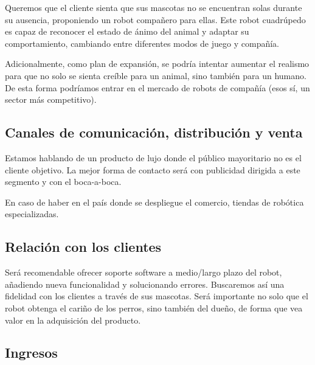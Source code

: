 Queremos que el cliente sienta que sus mascotas no se encuentran solas durante su ausencia, proponiendo un robot compañero para ellas. Este robot cuadrúpedo es capaz de reconocer el estado de ánimo del animal y adaptar su comportamiento, cambiando entre diferentes modos de juego y compañía.

Adicionalmente, como plan de expansión, se podría intentar aumentar el realismo para que no solo se sienta creíble para un animal, sino también para un humano. De esta forma podríamos entrar en el mercado de robots de compañía (esos sí, un sector más competitivo).

\subsection{Canales de comunicación, distribución y venta}


Estamos hablando de un producto de lujo donde el público mayoritario no es el cliente objetivo. La mejor forma de contacto será con publicidad dirigida a este segmento y con el boca-a-boca.

En caso de haber en el país donde se despliegue el comercio, tiendas de robótica especializadas.

\subsection{Relación con los clientes}


Será recomendable ofrecer soporte software a medio/largo plazo del robot, añadiendo nueva funcionalidad y solucionando errores. Buscaremos así una fidelidad con los clientes a través de sus mascotas.
Será importante no solo que el robot obtenga el cariño de los perros, sino también del dueño, de forma que vea valor en la adquisición del producto.

\subsection{Ingresos}



